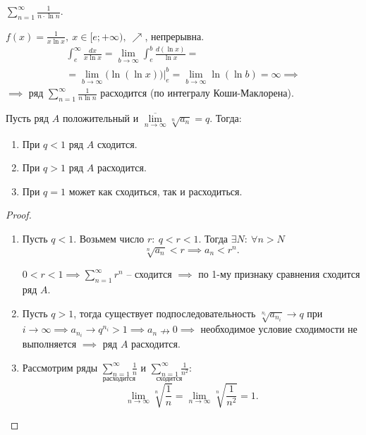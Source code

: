 \begin{example}
    $\sum_{n=1}^{\infty}\frac{1}{n\cdot \ln n}$.

    $f(x) = \frac{1}{x\ln x}, \ x \in [e;+\infty), \ \nearrow$, непрерывна.
    \begin{multline*}
        \int_{e}^{\infty}\frac{dx}{x\ln x} = \underset{b\rightarrow\infty}{\lim}\int_{e}^{b}\frac{d(\ln x)}{\ln x} =\\
        = \underset{b\rightarrow\infty}{\lim}\big(\ln(\ln x)\big)\Big|_e^b = \underset{b\rightarrow\infty}{\lim}\ln (\ln b) = \infty \implies
    \end{multline*}
    $\implies$ ряд $\sum_{n=1}^{\infty}\frac{1}{n\ln n}$ расходится (по интегралу Коши-Маклорена).
\end{example}

\begin{theorem}
    Пусть ряд $A$ положительный и $\underset{n\rightarrow\infty}{\overline{\lim}}\sqrt[n]{a_n} = q$. Тогда:
    \begin{enumerate}
        \item При $q < 1$ ряд $A$ сходится.
        \item При $q > 1$ ряд $A$ расходится.
        \item При $q = 1$ может как сходиться, так и расходиться.
    \end{enumerate}
\end{theorem}

\begin{proof}\leavevmode
    \begin{enumerate}
        \item Пусть $q < 1$. Возьмем число $r: \ q < r < 1$. Тогда $\exists N: \ \forall n > N$
              \[
                  \sqrt[n]{a_n} < r \implies a_n < r^n.
              \]

              $0 < r < 1 \implies \sum_{n=1}^{\infty}r^n$ -- сходится $\implies$ по 1-му признаку сравнения сходится ряд $A$.

        \item Пусть $q > 1$, тогда существует подпоследовательность $\sqrt[n_i]{a_{n_i}} \rightarrow q$ при $i\rightarrow\infty \implies a_{n_i}\rightarrow q^{n_i} > 1 \implies a_n \nrightarrow  0 \implies $ необходимое условие сходимости не выполняется $ \implies $ ряд $A$ расходится.

        \item Рассмотрим ряды $\underset{\text{расходится}}{\sum_{n=1}^{\infty}\frac{1}{n}}$ и $\underset{\text{сходится}}{\sum_{n=1}^{\infty}\frac{1}{n^2}}$:
              \[
                  \underset{n\rightarrow\infty}{\lim}\sqrt[n]{\frac{1}{n}} = \underset{n\rightarrow\infty}{\lim}\sqrt[n]{\frac{1}{n^2}} = 1.
              \]
    \end{enumerate}
\end{proof}

